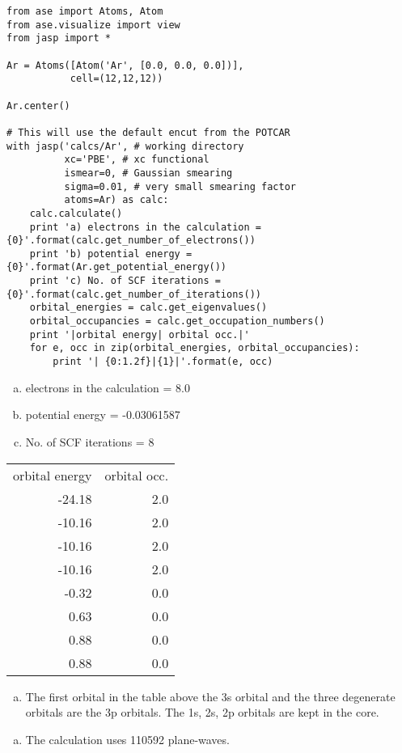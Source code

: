 \documentclass[11pt]{article}
\begin{document}
\begin{verbatim}
from ase import Atoms, Atom
from ase.visualize import view
from jasp import *

Ar = Atoms([Atom('Ar', [0.0, 0.0, 0.0])],
           cell=(12,12,12))

Ar.center()

# This will use the default encut from the POTCAR
with jasp('calcs/Ar', # working directory
          xc='PBE', # xc functional
          ismear=0, # Gaussian smearing
          sigma=0.01, # very small smearing factor
          atoms=Ar) as calc:
    calc.calculate()
    print 'a) electrons in the calculation = {0}'.format(calc.get_number_of_electrons())
    print 'b) potential energy = {0}'.format(Ar.get_potential_energy())
    print 'c) No. of SCF iterations = {0}'.format(calc.get_number_of_iterations())
    orbital_energies = calc.get_eigenvalues()
    orbital_occupancies = calc.get_occupation_numbers()
    print '|orbital energy| orbital occ.|'
    for e, occ in zip(orbital_energies, orbital_occupancies):
        print '| {0:1.2f}|{1}|'.format(e, occ)
\end{verbatim}

\begin{enumerate}[(a)]
\item electrons in the calculation = 8.0
\item potential energy = -0.03061587
\item No. of SCF iterations = 8
\end{enumerate}
\begin{center}
\begin{tabular}{rr}
orbital energy & orbital occ.\\
-24.18 & 2.0\\
-10.16 & 2.0\\
-10.16 & 2.0\\
-10.16 & 2.0\\
-0.32 & 0.0\\
0.63 & 0.0\\
0.88 & 0.0\\
0.88 & 0.0\\
\end{tabular}
\end{center}

\begin{enumerate}[(d)]
\item The first orbital in the table above the 3s orbital and the three degenerate orbitals are the 3p orbitals. The 1s, 2s, 2p orbitals are kept in the core.
\end{enumerate}
\begin{enumerate}[(e)]
\item The calculation uses 110592 plane-waves.
\end{enumerate}
\end{document}

